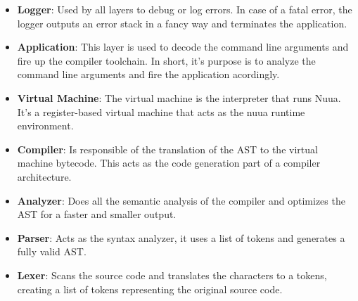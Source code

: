 \begin{itemize}
    \item \textbf{Logger}: Used by all layers to debug or log errors. In case of a fatal error, the logger outputs
        an error stack in a fancy way and terminates the application.
    \item \textbf{Application}: This layer is used to decode the command line arguments and fire up the compiler toolchain. In short, it's
        purpose is to analyze the command line arguments and fire the application acordingly.
    \item \textbf{Virtual Machine}: The virtual machine is the interpreter that runs Nuua. It's a register-based virtual machine that
        acts as the nuua runtime environment.
    \item \textbf{Compiler}: Is responsible of the translation of the AST to the virtual machine bytecode. This acts as the code generation
        part of a compiler architecture.
    \item \textbf{Analyzer}: Does all the semantic analysis of the compiler and optimizes the AST for a faster and smaller output.
    \item \textbf{Parser}: Acts as the syntax analyzer, it uses a list of tokens and generates a fully valid AST.
    \item \textbf{Lexer}: Scans the source code and translates the characters to a tokens, creating a list of tokens representing
        the original source code.
\end{itemize}
